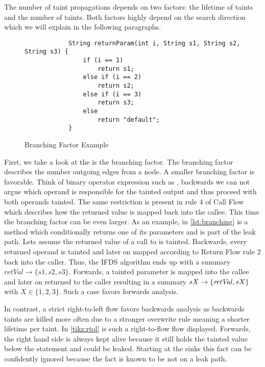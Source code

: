 \documentclass[../draft.tex]{subfiles}
\begin{document}
    The number of taint propagations depends on two factors: the lifetime of taints and the number of taints. Both factors highly depend on the search direction which we will explain in the following paragraphs.

    \begin{figure}[ht]
        \begin{lstlisting}
            String returnParam(int i, String s1, String s2, String s3) {
                if (i == 1)
                    return s1;
                else if (i == 2)
                    return s2;
                else if (i == 3)
                    return s3;
                else
                    return "default";
            }
        \end{lstlisting}
        \caption{Branching Factor Example}
        \label{lst:branching}
    \end{figure}

    First, we take a look at the is the branching factor. The branching factor describes the number outgoing edges from a node. A smaller branching factor is favorable.   
    Think of binary operator expression such as , backwards we can not argue which operand is responsible for the tainted output and thus proceed with both operands tainted. The same restriction is present in rule 4 of Call Flow which describes how the returned value is mapped back into the callee. This time the branching factor can be even larger. As an example, in \autoref{lst:branching} is a method which conditionally returns one of its parameters and is part of the leak path. Lets assume the returned value of a call to  is tainted. Backwards, every returned operand is tainted and later on mapped according to Return Flow rule 2 back into the caller. Thus, the IFDS algorithm ends up with a summary $\mathit{retVal} \rightarrow \{s1, s2, s3\}$. Forwards, a tainted parameter is mapped into the callee and later on returned to the caller resulting in a summary $sX \rightarrow \mathit\{\mathit{retVal}, sX\}$ with $X \in \{1,2,3\}$. Such a case favors forwards analysis.

    In contrast, a strict right-to-left flow favors backwards analysis as backwards taints are killed more often due to a stronger overwrite rule meaning a shorter lifetime per taint. In \autoref{tikz:rtol} is such a right-to-flow flow displayed. Forwards, the right hand side is always kept alive because it still holds the tainted value below the statement and could be leaked. Starting at the sinks this fact can be confidently ignored because the fact is known to be not on a leak path.
    
\end{document}
